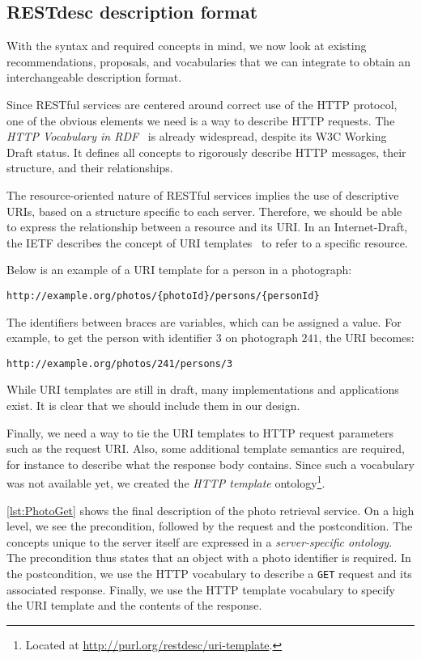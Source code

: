 \documentclass[runningheads,a4paper, twocolumn]{llncs}
\begin{document}
\subsection{RESTdesc description format}
With the syntax and required concepts in mind, we now look at existing recommendations, proposals, and vocabularies that we can integrate to obtain an interchangeable description format.

Since RESTful services are centered around correct use of the HTTP protocol, one of the obvious elements we need is a way to describe HTTP requests. The \emph{HTTP Vocabulary in RDF}~\cite{HTTPinRDF} is already widespread, despite its W3C Working Draft status. It defines all concepts to rigorously describe HTTP messages, their structure, and their relationships.

The resource-oriented nature of RESTful services implies the use of descriptive URIs, based on a structure specific to each server. Therefore, we should be able to express the relationship between a resource and its URI. In an Internet-Draft, the IETF describes the concept of URI templates~\cite{URITemplate} to refer to a specific resource.

\needspace{2em} Below is an example of a URI template for a person in a photograph:
\begin{Verbatim}
http://example.org/photos/{photoId}/persons/{personId}
\end{Verbatim}
The identifiers between braces are variables, which can be assigned a value. For example, to get the person with identifier $3$ on photograph $241$, the URI becomes:
\begin{Verbatim}
http://example.org/photos/241/persons/3
\end{Verbatim}

While URI templates are still in draft, many implementations and applications exist. It is clear that we should include them in our design.

Finally, we need a way to tie the URI templates to HTTP request parameters such as the request URI. Also, some additional template semantics are required, for instance to describe what the response body contains. Since such a vocabulary was not available yet, we created the \emph{HTTP template} ontology\footnote{Located at {\fontsize{8}{10}\url{http://purl.org/restdesc/uri-template}}.}.

\autoref{lst:PhotoGet} shows the final description of the photo retrieval service. On a high level, we see the precondition, followed by the request and the postcondition. The concepts unique to the server itself are expressed in a \emph{server-specific ontology}. The precondition thus states that an object with a photo identifier is required. In the postcondition, we use the HTTP vocabulary to describe a \Verb!GET! request and its associated response. Finally, we use the HTTP template vocabulary to specify the URI template and the contents of the response.
\end{document}
